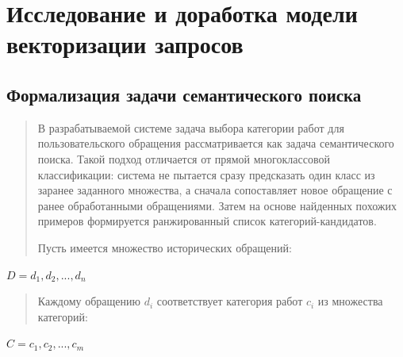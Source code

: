\hypertarget{ux438ux441ux441ux43bux435ux434ux43eux432ux430ux43dux438ux435-ux438-ux434ux43eux440ux430ux431ux43eux442ux43aux430-ux43cux43eux434ux435ux43bux438-ux432ux435ux43aux442ux43eux440ux438ux437ux430ux446ux438ux438-ux437ux430ux43fux440ux43eux441ux43eux432}{%
\section{Исследование и доработка модели векторизации
запросов}\label{ux438ux441ux441ux43bux435ux434ux43eux432ux430ux43dux438ux435-ux438-ux434ux43eux440ux430ux431ux43eux442ux43aux430-ux43cux43eux434ux435ux43bux438-ux432ux435ux43aux442ux43eux440ux438ux437ux430ux446ux438ux438-ux437ux430ux43fux440ux43eux441ux43eux432}}

\hypertarget{ux444ux43eux440ux43cux430ux43bux438ux437ux430ux446ux438ux44f-ux437ux430ux434ux430ux447ux438-ux441ux435ux43cux430ux43dux442ux438ux447ux435ux441ux43aux43eux433ux43e-ux43fux43eux438ux441ux43aux430}{%
\subsection{\texorpdfstring{Формализация задачи семантического поиска
}{Формализация задачи семантического поиска }}\label{ux444ux43eux440ux43cux430ux43bux438ux437ux430ux446ux438ux44f-ux437ux430ux434ux430ux447ux438-ux441ux435ux43cux430ux43dux442ux438ux447ux435ux441ux43aux43eux433ux43e-ux43fux43eux438ux441ux43aux430}}

\begin{quote}
В разрабатываемой системе задача выбора категории работ для
пользовательского обращения рассматривается как задача семантического
поиска. Такой подход отличается от прямой многоклассовой классификации:
система не пытается сразу предсказать один класс из заранее заданного
множества, а сначала сопоставляет новое обращение с ранее обработанными
обращениями. Затем на основе найденных похожих примеров формируется
ранжированный список категорий-кандидатов.

Пусть имеется множество исторических обращений:
\end{quote}

\(D = d_{1},d_{2},...,d_{n}\)

\begin{quote}
Каждому обращению \(d_{i}\) соответствует категория работ \(c_{i}\) из
множества категорий:
\end{quote}

\(C = c_{1},c_{2},...,c_{m}\)

